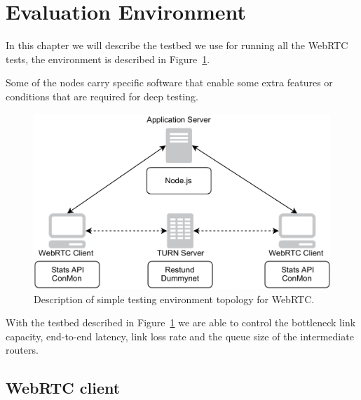 \section{Evaluation Environment}
\label{sec:testingEnv}

\thispagestyle{empty}

In this chapter we will describe the testbed we use for running all the WebRTC tests, the environment is described in Figure~\ref{fig:evaluation_arch}. 

Some of the nodes carry specific software that enable some extra features or conditions that are required for deep testing.

 \begin{figure}[h]
  \centering
    \includegraphics[width=1\textwidth]{./figures/evaluation_arch.pdf}
      \caption[Description of simple testing environment topology for WebRTC]{Description of simple testing environment topology for WebRTC.}
	\label{fig:evaluation_arch}
\end{figure}

With the testbed described in Figure~\ref{fig:evaluation_arch} we are able to control the bottleneck link capacity, end-to-end latency, link loss rate and the queue size of the intermediate routers.

%

\subsection{WebRTC client}


